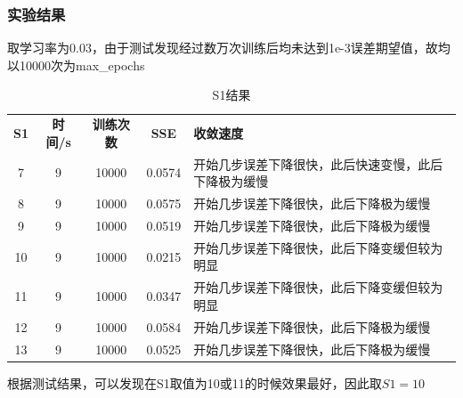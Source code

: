\documentclass[UTF8]{article}
\begin{document}
\subsubsection{实验结果}
取学习率为0.03，由于测试发现经过数万次训练后均未达到1e-3误差期望值，故均以10000次为max\_epochs
\begin{table}[H] \centering
    \begin{tabular}{ccccl}
    \rowcolor[HTML]{FFFFFF} 
    {\color[HTML]{333333} \textbf{S1}} & {\color[HTML]{333333} \textbf{时间/s}} & {\color[HTML]{333333} \textbf{训练次数}} & {\color[HTML]{333333} \textbf{SSE}} & {\color[HTML]{333333} \textbf{收敛速度}} \\
    \rowcolor[HTML]{FFFFFF} 
    {\color[HTML]{333333} 7} & {\color[HTML]{333333} 9} & {\color[HTML]{333333} 10000} & {\color[HTML]{333333} 0.0574} & {\color[HTML]{333333} 开始几步误差下降很快，此后快速变慢，此后下降极为缓慢} \\
    \rowcolor[HTML]{F8F8F8} 
    {\color[HTML]{333333} 8} & {\color[HTML]{333333} 9} & {\color[HTML]{333333} 10000} & {\color[HTML]{333333} 0.0575} & {\color[HTML]{333333} 开始几步误差下降很快，此后下降极为缓慢} \\
    \rowcolor[HTML]{FFFFFF} 
    {\color[HTML]{333333} 9} & {\color[HTML]{333333} 9} & {\color[HTML]{333333} 10000} & {\color[HTML]{333333} 0.0519} & {\color[HTML]{333333} 开始几步误差下降很快，此后下降极为缓慢} \\
    \rowcolor[HTML]{F8F8F8} 
    {\color[HTML]{333333} 10} & {\color[HTML]{333333} 9} & {\color[HTML]{333333} 10000} & {\color[HTML]{333333} 0.0215} & {\color[HTML]{333333} 开始几步误差下降很快，此后下降变缓但较为明显} \\
    \rowcolor[HTML]{FFFFFF} 
    {\color[HTML]{333333} 11} & {\color[HTML]{333333} 9} & {\color[HTML]{333333} 10000} & {\color[HTML]{333333} 0.0347} & {\color[HTML]{333333} 开始几步误差下降很快，此后下降变缓但较为明显} \\
    \rowcolor[HTML]{F8F8F8} 
    {\color[HTML]{333333} 12} & {\color[HTML]{333333} 9} & {\color[HTML]{333333} 10000} & {\color[HTML]{333333} 0.0584} & {\color[HTML]{333333} 开始几步误差下降很快，此后下降极为缓慢} \\
    \rowcolor[HTML]{FFFFFF} 
    {\color[HTML]{333333} 13} & {\color[HTML]{333333} 9} & {\color[HTML]{333333} 10000} & {\color[HTML]{333333} 0.0525} & {\color[HTML]{333333} 开始几步误差下降很快，此后下降极为缓慢}
    \end{tabular}
\caption[0.3\textwidth]{S1结果}
\end{table}
根据测试结果，可以发现在S1取值为10或11的时候效果最好，因此取$S1=10$
\end{document}
